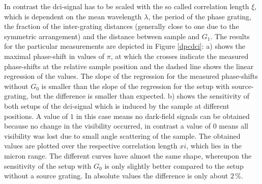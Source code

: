 In contrast the \gls{dci}-signal has to be scaled with the so called correlation length $\xi$, which is dependent on the mean wavelength $\lambda$, the period of the phase grating, the fraction of the inter-grating distances (generally close to one due to the symmetric arrangement) and the distance between sample and $G_{1}$. The results for the particular measurements are depicted in Figure \ref{dpcdci}: a) shows the maximal phase-shift in values of $\pi$, at which the crosses indicate the measured phase-shifts at the relative sample position and the dashed line shows the linear regression of the values. The slope of the regression for the measured phase-shifts without $G_{0}$ is smaller than the slope of the regression for the setup with source-grating, but the difference is smaller than expected. b) shows the sensitivity of both setups of the \gls{dci}-signal which is induced by the sample at different positions. A value of $1$ in this case means no dark-field signals can be obtained because no change in the visibility occurred, in contrast a value of $0$ means all visibility was lost due to small angle scattering of the sample. The obtained values are plotted over the respective correlation length $xi$, which lies in the micron range. The different curves have almost the same shape, whereupon the sensitivity of the setup with $G_{0}$ is only slightly better compared to the setup without a source grating. In absolute values the difference is only about $2\,$\%.


